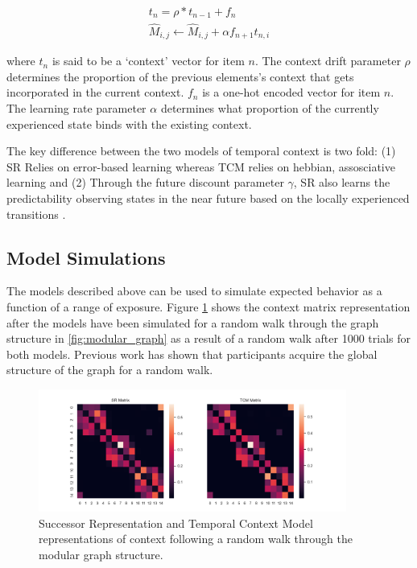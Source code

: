 \begin{equation}
	\begin{aligned}
		t_n = \rho * t_{n-1} + f_n \\ 
		\hat{M}_{i, j} \leftarrow \hat{M}_{i, j} + \alpha f_{n+1} t_{n, i}			
	\end{aligned}
\end{equation}

where $t_n$ is said to be a `context' vector for item $n$. The context drift parameter $\rho$ determines the proportion of the previous elements's context that gets incorporated in the current context. $f_n$ is a one-hot encoded vector for item $n$. The learning rate parameter $\alpha$ determines what proportion of the currently experienced state binds with the existing context. 

The key difference between the two models of temporal context is two fold: (1) SR Relies on error-based learning whereas TCM relies on hebbian, assosciative learning and (2) Through the future discount parameter $\gamma$, SR also learns the predictability observing states in the near future based on the locally experienced transitions \cite{gershman2012successor}.

\subsection{Model Simulations}
The models described above can be used to simulate expected behavior as a function of a range of exposure. Figure \ref{fig:SR-TCM-model-simulations} shows the context matrix representation after the models have been simulated for a random walk through the graph structure in \ref{fig:modular_graph} as a result of a random walk after 1000 trials for both models. Previous work has shown that participants acquire the global structure of the graph for a random walk. 

\begin{figure}[!ht]
	\label{fig:SR-TCM-model-simulations}
	\centering
	\includegraphics[width = 0.9\textwidth]{chapter_notebooks/chapter_2/figures/SR_vs_TCM_Matrices.png}
	\caption{Successor Representation and Temporal Context Model representations of context following a random walk through the modular graph structure.}
\end{figure}

